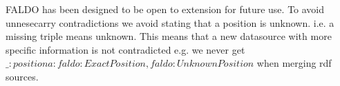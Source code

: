 FALDO has been designed to be open to extension for future use.
To avoid unnesecarry contradictions we avoid stating that a position is unknown.
i.e. a missing triple means unknown. 
This means that a new datasource with more specific information is not contradicted e.g.
we never get $\_:position a :faldo:ExactPosition,faldo:UnknownPosition$ when merging rdf sources.


